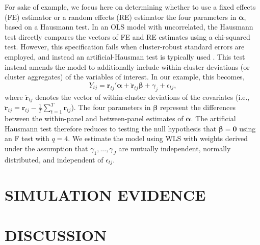 \documentclass[12pt]{article}\usepackage[]{graphicx}\usepackage[]{color}
\newcommand{\bm}{\mathbf}
\newcommand{\bs}{\boldsymbol}
\begin{document}
For sake of example, we focus here on determining whether to use a fixed effects (FE) estimator or a random effects (RE) estimator the four parameters in $\bs\alpha$, based on a Hausmann test. In an OLS model with uncorrelated, the Hausmann test directly compares the vectors of FE and RE estimates using a chi-squared test. However, this specification fails when cluster-robust standard errors are employed, and instead an artificial-Hausman test \citep{Arellano1993on} is typically used \citep[pp. 290-291]{Wooldridge2002econometric}. This test instead amends the model to additionally include within-cluster deviations (or cluster aggregates) of the variables of interest. In our example, this becomes,
\begin{equation}
Y_{tj} = \bm{r}_{tj}'\bs\alpha + \bm{\ddot{r}}_{tj}\bs\beta + \gamma_j + \epsilon_{tj},
\end{equation}
where $\bm{\ddot{r}}_{tj}$ denotes the vector of within-cluster deviations of the covariates (i.e., $\bm{\ddot{r}}_{tj} = \bm{r}_{tj} - \frac{1}{T}\sum_{t=1}^T \bm{r}_{tj}$).
The four parameters in $\bs\beta$ represent the differences between the within-panel and between-panel estimates of $\bs\alpha$. The artificial Hausmann test therefore reduces to testing the null hypothesis that $\bs\beta = \bm{0}$ using an F test with $q = 4$. We estimate the model using WLS with weights derived under the assumption that  $\gamma_1,...,\gamma_J$ are mutually independent, normally distributed, and independent of $\epsilon_{tj}$.

\section{SIMULATION EVIDENCE}
\label{subsec:simulations}

\section{DISCUSSION}
\label{sec:discussion}

\end{document}
